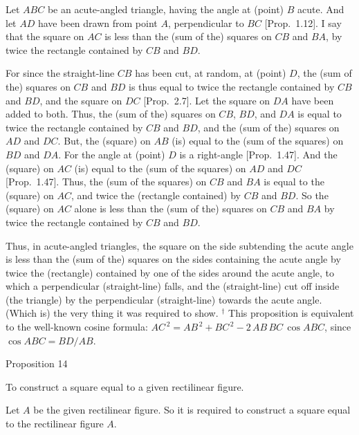  \epsfysize=2in
\centerline{}

 Let $ABC$ be an acute-angled triangle, having the  angle at (point) $B$ acute.
 And let $AD$ have been drawn from point $A$, perpendicular to $BC$ [Prop.~1.12].
I say that the square on $AC$ is less than the (sum of the) squares on $CB$ and $BA$, by twice the rectangle contained by $CB$ and $BD$.

For since the straight-line $CB$ has been cut, at random, at (point) $D$, the
(sum of the) squares on $CB$ and $BD$ is thus equal to twice the rectangle contained by $CB$ and $BD$, and the square on $DC$ [Prop.~2.7]. Let the
square on $DA$ have been added to both. Thus, the (sum of the) squares on
$CB$, $BD$, and $DA$ is equal to twice  the rectangle contained by $CB$ and $BD$,
and the (sum of the) squares on $AD$ and $DC$. But, the (square) on $AB$ (is) equal to the (sum
of the squares) on $BD$ and $DA$. For the angle at (point) $D$ is a right-angle [Prop.~1.47]. And the (square) on $AC$ (is) equal to the (sum of the squares)
on $AD$ and $DC$ [Prop.~1.47]. Thus, the (sum of the squares) on $CB$ and $BA$
is equal to the (square) on  $AC$, and twice the (rectangle contained) by $CB$
and $BD$. So the (square) on $AC$ alone is less than the (sum of the) squares on
$CB$ and $BA$ by twice the rectangle contained by $CB$ and $BD$.

Thus, in acute-angled triangles, the square on the side subtending the acute angle
is less than the (sum of the) squares on the sides containing the acute
angle by twice the (rectangle) contained by one of the sides around the acute
angle, to which a perpendicular (straight-line) falls, and the 
 (straight-line) cut off inside (the triangle)
 by the perpendicular (straight-line) towards the acute angle. (Which is)
 the very thing it 	was required to show.
{\footnotesize \noindent$^\dag$ This proposition is equivalent
to the well-known cosine formula: $AC^{\,2} = AB^{\,2} + BC^{\,2} -2\,AB\, BC\,\cos ABC$, since $\cos ABC = BD / AB$.}


\begin{center}
{\large Proposition 14}
\end{center}

To construct a square equal to a given rectilinear figure.

\epsfysize=2in
\centerline{}

Let $A$ be the given rectilinear figure. So it is required to construct a
square equal to the rectilinear figure $A$.

